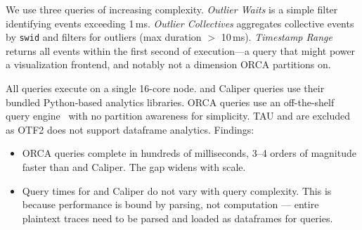 
We use three queries of increasing complexity.
\emph{Outlier Waits} is a simple filter identifying \mpiw{} events exceeding 1\,ms.
\emph{Outlier Collectives} aggregates collective events by \texttt{swid} and filters for outliers (max
duration $>$ 10\,ms).
\emph{Timestamp Range} returns all events within the first second of execution---a query that
might power a visualization frontend, and notably not a dimension ORCA partitions on.

All queries execute on a single 16-core node.
\dftracer{} and Caliper queries use their bundled Python-based analytics libraries.
ORCA queries use an off-the-shelf query engine~\cite{:Polars} with no partition awareness for simplicity.
TAU and \scorep{} are excluded as OTF2 does not support dataframe analytics.
Findings:

\begin{itemize}[leftmargin=*]
  \item ORCA queries complete in hundreds of milliseconds, 3--4 orders of magnitude faster than
        \dftracer{} and Caliper.
        The gap widens with scale.
  \item Query times for \dftracer{} and Caliper do not vary with query complexity.
        This is because performance is bound by parsing, not computation --- entire plaintext traces need
        to be parsed and loaded as dataframes for queries.
\end{itemize}

